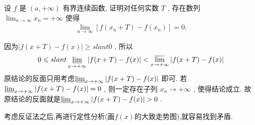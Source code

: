 \documentclass[../../main.tex]{subfiles}
\begin{document}
\begin{example}
设 \(f\) 是 \((a, +\infty)\) 有界连续函数, 证明对任何实数 \(T\) , 存在数列 \(\lim_{n \to \infty} x_n = +\infty\) 使得
\begin{align*}
\lim_{n \to \infty} [f(x_n + T) - f(x_n)] = 0.
\end{align*}
\end{example}
\begin{remark}
因为\(\vert f(x + T) - f(x)\vert \geqslant slant 0\) , 所以
\begin{align*}
0\leqslant slant \varliminf_{x \to +\infty} \vert f(x + T) - f(x)\vert < \varlimsup_{x \to +\infty} \vert f(x + T) - f(x)\vert
\end{align*}
原结论的反面只用考虑\(\varliminf_{x \to +\infty} \vert f(x + T) - f(x)\vert\) 即可. 若\(\varliminf_{x \to +\infty} \vert f(x + T) - f(x)\vert = 0\) , 则一定存在子列 \(x_n \to +\infty\) , 使得结论成立.
故原结论的反面就是\(\varliminf_{x \to +\infty} \vert f(x + T) - f(x)\vert > 0\) .
\end{remark}
\begin{note}
考虑反证法之后,再进行定性分析(画$f(x)$的大致走势图),就容易找到矛盾.
\end{note}
\end{document}
